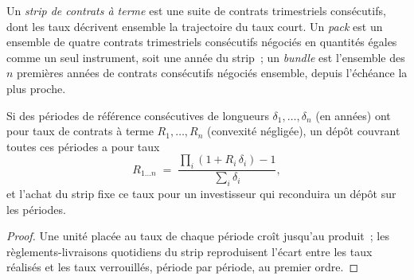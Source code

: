 \begin{definition}\label{def:m2:short-term-interest-rate-futures:strip}
Un \emph{strip de contrats à terme} est une suite de
contrats trimestriels consécutifs, dont les taux décrivent ensemble la trajectoire du taux court.
Un \emph{pack} est un ensemble de quatre contrats trimestriels consécutifs négociés en
quantités égales comme un seul instrument, soit une année du strip~; un
\emph{bundle} est l'ensemble des $n$ premières années de contrats consécutifs
négociés ensemble, depuis l'échéance la plus proche.
\end{definition}

\begin{proposition}\label{prop:m2:short-term-interest-rate-futures:strip}
Si des périodes de référence consécutives de longueurs $\delta_1, \dots, \delta_n$ (en
années) ont pour taux de contrats à terme $R_1, \dots, R_n$ (convexité négligée), un dépôt
couvrant toutes ces périodes a pour taux
\[
R_{1\dots n} \;=\; \frac{\prod_{i}(1 + R_i\,\delta_i) - 1}{\sum_i \delta_i},
\]
et l'achat du strip fixe ce taux pour un investisseur qui reconduira un
dépôt sur les périodes.
\end{proposition}
\begin{proof}
Une unité placée au taux de chaque période croît jusqu'au produit~; les
règlements-livraisons quotidiens du strip reproduisent l'écart entre les taux réalisés et les
taux verrouillés, période par période, au premier ordre.
\end{proof}

